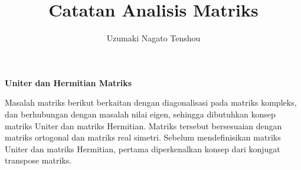 \documentclass[11pt,a4paper]{article}
\author{Uzumaki Nagato Tenshou}
\title{Catatan Analisis Matriks}
\begin{document}
\maketitle


\begin{center}
	\textbf{Uniter dan Hermitian Matriks}
\end{center}



Masalah matriks berikut berkaitan dengan diagonalisasi pada matriks kompleks, dan berhubungan dengan masalah nilai eigen, sehingga dibutuhkan konsep matriks Uniter dan matriks Hermitian. Matriks tersebut bersesuaian dengan matriks ortogonal dan matriks real simetri. Sebelum mendefinisikan matriks Uniter dan matriks Hermitian, pertama diperkenalkan konsep dari konjugat transpose matriks.
\end{document}
